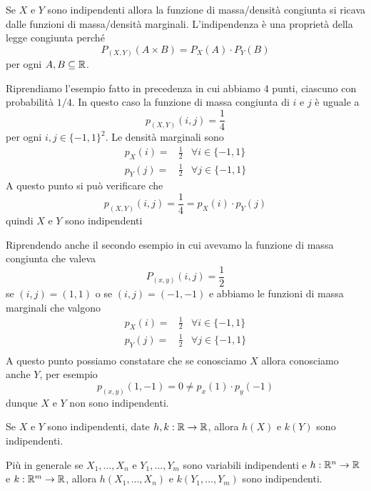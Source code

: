 \begin{observation}
	Se $X$ e $Y$ sono indipendenti allora la funzione di massa/densità congiunta si ricava dalle
	funzioni di massa/densità marginali. L'indipendenza è una proprietà della legge congiunta
	perché
	\[ P_{(X,Y)} (A \times B) = P_X(A) \cdot P_Y(B) \]
	per ogni $A, B \subseteq \mathbb{R}$.
\end{observation}

\begin{example}
	Riprendiamo l'esempio fatto in precedenza in cui abbiamo 4 punti, ciascuno con probabilità
	$1/4$. In questo caso la funzione di massa congiunta di $i$ e $j$ è uguale a
	\[ p_{(X,Y)} (i,j) = \frac{1}{4} \]
	per ogni $i,j \in \{ -1, 1 \}^2$. Le densità marginali sono
	\begin{align*}
		p_X(i) = & \frac{1}{2} & \forall i \in \{ -1, 1 \} \\
		p_Y(j) = & \frac{1}{2} & \forall j \in \{ -1, 1 \}
	\end{align*}
	A questo punto si può verificare che
	\[ p_{(X,Y)} (i,j) = \frac{1}{4} = p_X(i) \cdot p_Y(j) \]
	quindi $X$ e $Y$ sono indipendenti
\end{example}

\begin{example}
	Riprendendo anche il secondo esempio in cui avevamo la funzione di massa congiunta che valeva
	\[ P_{(x,y)} (i,j) = \frac{1}{2} \]
	se $(i,j) = (1,1)$ o se $(i,j) = (-1,-1)$ e abbiamo le funzioni di massa marginali che valgono
	\begin{align*}
		p_X(i) = & \frac{1}{2} & \forall i \in \{ -1, 1 \} \\
		p_Y(j) = & \frac{1}{2} & \forall j \in \{ -1, 1 \} \\
	\end{align*}
	A questo punto possiamo constatare che se conosciamo $X$ allora conosciamo anche $Y$, per
	esempio
	\[ p_{(x,y)} (1,-1) = 0 \neq p_x(1) \cdot p_y(-1) \]
	dunque $X$ e $Y$ non sono indipendenti.
\end{example}

\begin{proposition}
	Se $X$ e $Y$ sono indipendenti, date $h, k : \mathbb{R} \to \mathbb{R}$, allora $h(X)$ e $k(Y)$ sono
	indipendenti.
\end{proposition}

Più in generale se $X_1, \dots, X_n$ e $Y_1, \dots, Y_m$ sono variabili indipendenti e
$h : \mathbb{R}^n \to \mathbb{R}$ e $k : \mathbb{R}^m \to \mathbb{R}$, allora $h(X_1, \dots, X_n)$ e $k(Y_1, \dots, Y_m)$ sono
indipendenti.

